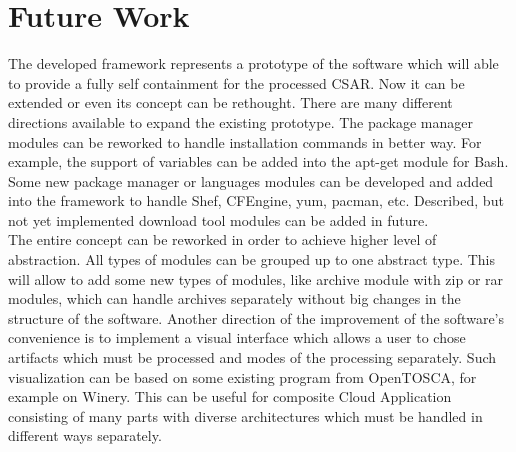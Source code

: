 \section*{Future Work}
The developed framework represents a prototype of the software which will able to provide a fully self containment for the processed CSAR.
Now it can be extended or even its concept can be rethought.
There are many different directions available to expand the existing prototype.
The package manager modules can be reworked to handle installation commands in better way.
For example, the support of variables can be added into the apt-get module for Bash.
Some new package manager or languages modules can be developed and added into the framework to handle Shef, CFEngine, yum, pacman, etc.
Described, but not yet implemented download tool modules can be added in future.\\
The entire concept can be reworked in order to achieve higher level of abstraction.
All types of modules can be grouped up to one abstract type.
This will allow to add some new types of modules, like archive module with zip or rar modules, which can handle archives separately without big changes in the structure of the software.
Another direction of the improvement of the software's convenience is to implement a visual interface which allows a user to chose artifacts which must be processed and modes of the processing separately.
Such visualization can be based on some existing program from OpenTOSCA, for example on Winery.
This can be useful for composite Cloud Application consisting of many parts with diverse architectures which must be handled in different ways separately.
